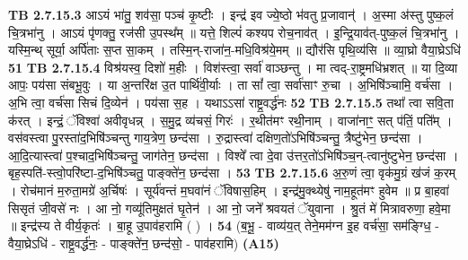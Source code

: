 \documentclass[17pt]{extarticle}
\begin{document}
{                  \newline
                                \textbf{ TB 2.7.15.3} \newline
                  आऽयं भा॑तु॒ शव॑सा॒ पञ्च॑ कृ॒ष्टीः । इन्द्र॑ इव ज्ये॒ष्ठो भ॑वतु प्र॒जावान्॑ । अ॒स्मा अ॑स्तु पुष्क॒लं चि॒त्रभा॑नु । आऽयं पृ॑णक्तु॒ रज॑सी उ॒पस्थ᳚म् ॥ यत्ते॒ शिल्पं॑ कश्यप रोच॒नाव॑त् । इ॒न्द्रि॒याव॑त्-पुष्क॒लं चि॒त्रभा॑नु । यस्मि॒न्थ् सूर्या॒ अर्पि॑ताः स॒प्त सा॒कम् । तस्मि॒न्-राजा॑न॒-मधि॒विश्र॑ये॒मम् ॥ द्यौर॑सि पृथि॒व्य॑सि ॥ व्या॒घ्रो वैया॒घ्रेऽधि॑ \textbf{ 51} \newline
                  \newline
                                \textbf{ TB 2.7.15.4} \newline
                  विश्र॑यस्व॒ दिशो॑ म॒हीः । विश॑स्त्वा॒ सर्वा॑ वाञ्छन्तु । मा त्वद्-रा॒ष्ट्रमधि॑भ्रशत् ॥ या दि॒व्या आपः॒ पय॑सा संबभू॒वुः । या अ॒न्तरि॑क्ष उ॒त पार्थि॑वी॒र्याः । ता सां᳚ त्वा॒ सर्वा॑साꣳ रु॒चा । अ॒भिषि॑ञ्चामि॒ वर्च॑सा । अ॒भि त्वा॒ वर्च॑सा सिचं दि॒व्येन॑ । पय॑सा स॒ह । यथाऽऽसा॑ राष्ट्र॒वर्द्ध॑नः \textbf{ 52} \newline
                  \newline
                                \textbf{ TB 2.7.15.5} \newline
                  तथा᳚ त्वा सवि॒ता क॑रत् । इन्द्रं॒ ॅविश्वा॑ अवीवृधन्न् । स॒मु॒द्र व्य॑चसं॒ गिरः॑ । र॒थीत॑मꣳ रथी॒नाम् । वाजा॑नाꣳ॒॒ सत् प॑तिं॒ पति᳚म् । वस॑वस्त्वा पु॒रस्ता॑द॒भिषि॑ञ्चन्तु गाय॒त्रेण॒ छन्द॑सा । रु॒द्रास्त्वा॑ दक्षिण॒तो॑ऽभिषि॑ञ्चन्तु॒ त्रैष्टु॑भेन॒ छन्द॑सा । आ॒दि॒त्यास्त्वा॑ प॒श्चाद॒भिषि॑ञ्चन्तु॒ जाग॑तेन॒ छन्द॑सा । विश्वे᳚ त्वा दे॒वा उ॑त्तर॒तो॑ऽभिषि॑ञ्च॒न्-त्वानु॑ष्टुभेन॒ छन्द॑सा । बृह॒स्पति॑-स्त्वो॒परि॑ष्टा-द॒भिषि॑ञ्चतु॒ पाङ्क्ते॑न॒ छन्द॑सा । \textbf{ 53} \newline
                  \newline
                                \textbf{ TB 2.7.15.6} \newline
                  अ॒रु॒णं त्वा॒ वृक॑मु॒ग्रं ख॑जं क॒रम् । रोच॑मानं म॒रुता॒मग्रे॑ अ॒र्चिषः॑ । सूर्य॑वन्तं म॒घवा॑नं ॅविषास॒हिम् । इन्द्र॑मु॒क्थ्येषु॑ नाम॒हूत॑मꣳ हुवेम ॥ प्र बा॒हवा॑ सिसृतं जी॒वसे॑ नः । आ नो॒ गव्यू॑तिमुक्षतं घृ॒तेन॑ । आ नो॒ जने᳚ श्रवयतं ॅयुवाना । श्रु॒तं मे॑ मित्रावरुणा॒ हवे॒मा ॥ इन्द्र॑स्य ते वीर्य॒कृतः॑ । बा॒हू उ॒पाव॑हरामि ( ) । \textbf{ 54} \newline
                  \newline
                                    (ब॒भू॒ - वाव्य॑य॒त् तेने॒मम॑ग्न इ॒ह वर्च॑सा॒ सम॑ङ्ग्धि॒ - वैया॒घ्रेऽधि॑ - राष्ट्र॒वर्द्ध॑नः॒ - पाङ्क्ते॑न॒ छन्द॑सो॒ - पाव॑हरामि) \textbf{(A15)} \newline \newline
}
\end{document}
